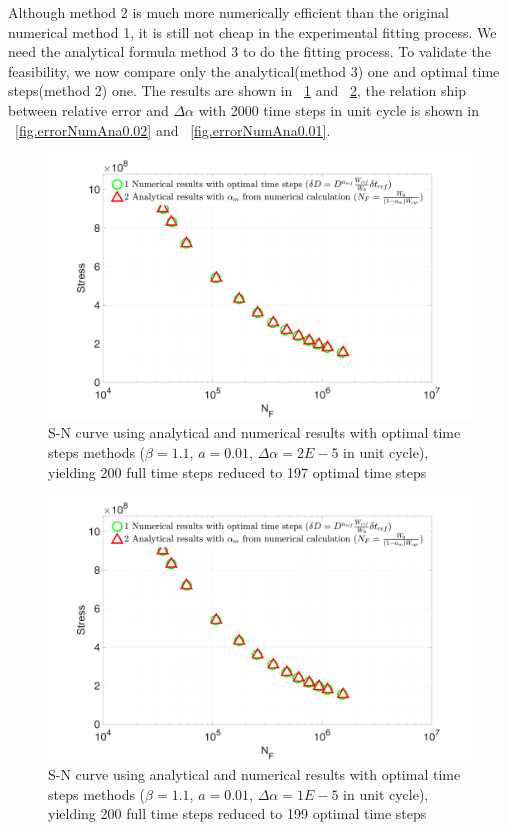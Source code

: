 \documentclass[3p,times,procedia,number]{elsarticle}
\newcommand{\figref}[1]{\figurename~\ref{#1}}
\begin{document}
Although method 2 is much more numerically efficient than the original numerical method 1, it is still not cheap in the experimental fitting process. We need the analytical formula method 3 to do the fitting process. To validate the feasibility, we now compare only the analytical(method 3) one and optimal time steps(method 2) one. The results are shown in \figref{fig.SNnumerical2methods} and \figref{fig.SNnumerical2methods2}, the relation ship between relative error and $\Delta \alpha$ with 2000 time steps in unit cycle is shown in  \figref{fig.errorNumAna0.02} and \figref{fig.errorNumAna0.01}.
\begin{figure}[!h]
	\centering
	\includegraphics[width=\textwidth]{figures//SN_opt_ana_200_delta_alp=0.00002.png} 
	\caption{S-N curve using analytical and numerical results with optimal time steps methods ($\beta=1.1$, $a=0.01$, $\Delta \alpha=2E-5$ in unit cycle), yielding 200 full time steps reduced to 197 optimal time steps}
	\label{fig.SNnumerical2methods}
\end{figure}
\begin{figure}[!h]
	\centering
	\includegraphics[width=\textwidth]{figures//SN_opt_ana_200_delta_alp=0.00001.png} 
	\caption{S-N curve using analytical and numerical results with optimal time steps methods ($\beta=1.1$, $a=0.01$, $\Delta \alpha=1E-5$ in unit cycle), yielding 200 full time steps reduced to 199 optimal time steps}
	\label{fig.SNnumerical2methods2}
\end{figure}
\end{document}
